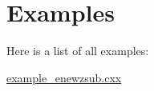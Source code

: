 \section{Examples}
Here is a list of all examples:\begin{DoxyCompactItemize}
\item 
\hyperlink{example_enewzsub_8cxx-example}{example\_\-enewzsub.cxx}
\end{DoxyCompactItemize}

